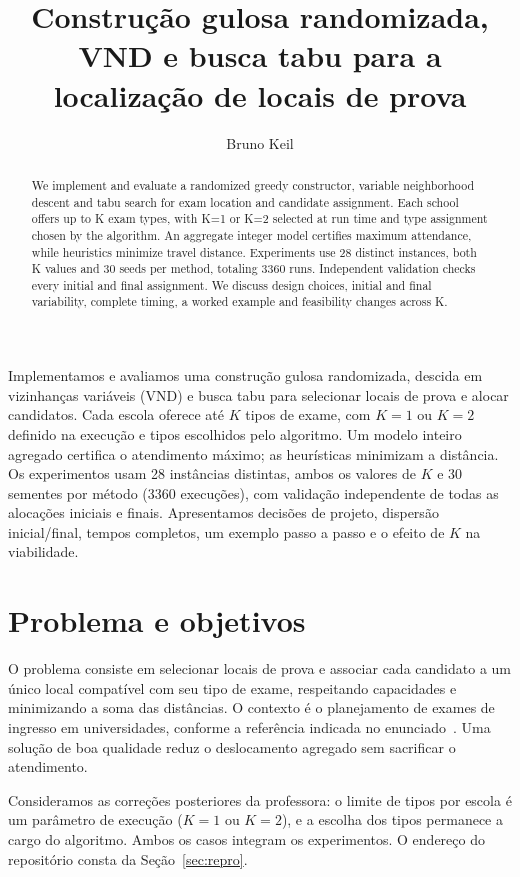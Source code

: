 \documentclass[12pt]{article}
\title{Construção gulosa randomizada, VND e busca tabu para a localização de locais de prova}
\author{Bruno Keil\inst{1}}
\begin{document}
\maketitle
\begin{abstract}
We implement and evaluate a randomized greedy constructor, variable neighborhood descent and tabu search for exam location and candidate assignment. Each school offers up to K exam types, with K=1 or K=2 selected at run time and type assignment chosen by the algorithm. An aggregate integer model certifies maximum attendance, while heuristics minimize travel distance. Experiments use 28 distinct instances, both K values and 30 seeds per method, totaling 3360 runs. Independent validation checks every initial and final assignment. We discuss design choices, initial and final variability, complete timing, a worked example and feasibility changes across K.
\end{abstract}
\begin{resumo}
Implementamos e avaliamos uma construção gulosa randomizada, descida em vizinhanças variáveis (VND) e busca tabu para selecionar locais de prova e alocar candidatos. Cada escola oferece até $K$ tipos de exame, com $K=1$ ou $K=2$ definido na execução e tipos escolhidos pelo algoritmo. Um modelo inteiro agregado certifica o atendimento máximo; as heurísticas minimizam a distância. Os experimentos usam 28 instâncias distintas, ambos os valores de $K$ e 30 sementes por método (3360 execuções), com validação independente de todas as alocações iniciais e finais. Apresentamos decisões de projeto, dispersão inicial/final, tempos completos, um exemplo passo a passo e o efeito de $K$ na viabilidade.
\end{resumo}

\section{Problema e objetivos}
O problema consiste em selecionar locais de prova e associar cada candidato a um único local compatível com seu tipo de exame, respeitando capacidades e minimizando a soma das distâncias. O contexto é o planejamento de exames de ingresso em universidades, conforme a referência indicada no enunciado~\cite{oliveira2021}. Uma solução de boa qualidade reduz o deslocamento agregado sem sacrificar o atendimento.

Consideramos as correções posteriores da professora: o limite de tipos por escola é um parâmetro de execução ($K=1$ ou $K=2$), e a escolha dos tipos permanece a cargo do algoritmo. Ambos os casos integram os experimentos. O endereço do repositório consta da Seção~\ref{sec:repro}.
\end{document}
